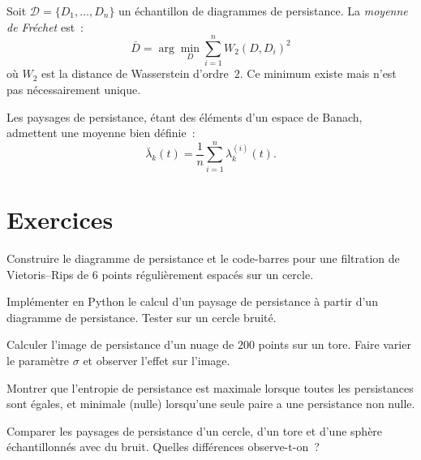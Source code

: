\begin{theoreme}
Soit $\mathcal{D} = \{D_1, \ldots, D_n\}$ un \'echantillon de
diagrammes de persistance. La \emph{moyenne de Fr\'echet} est~:
\[
  \bar{D} = \arg\min_{D} \sum_{i=1}^n W_2(D, D_i)^2
\]
o\`u $W_2$ est la distance de Wasserstein d'ordre~$2$. Ce minimum
existe mais n'est pas n\'ecessairement unique.
\end{theoreme}

\begin{proposition}
Les paysages de persistance, \'etant des \'el\'ements d'un espace de
Banach, admettent une moyenne bien d\'efinie~:
\[
  \bar{\lambda}_k(t) = \frac{1}{n} \sum_{i=1}^n \lambda_k^{(i)}(t).
\]
\end{proposition}

\section{Exercices}

\begin{exercice}
Construire le diagramme de persistance et le code-barres pour une
filtration de Vietoris--Rips de $6$ points r\'eguli\`erement espac\'es
sur un cercle.
\end{exercice}

\begin{exercice}
Impl\'ementer en Python le calcul d'un paysage de persistance \`a
partir d'un diagramme de persistance. Tester sur un cercle bruit\'e.
\end{exercice}

\begin{exercice}
Calculer l'image de persistance d'un nuage de $200$ points sur un tore.
Faire varier le param\`etre $\sigma$ et observer l'effet sur l'image.
\end{exercice}

\begin{exercice}
Montrer que l'entropie de persistance est maximale lorsque toutes les
persistances sont \'egales, et minimale (nulle) lorsqu'une seule paire
a une persistance non nulle.
\end{exercice}

\begin{exercice}
Comparer les paysages de persistance d'un cercle, d'un tore et d'une
sph\`ere \'echantillonn\'es avec du bruit. Quelles diff\'erences
observe-t-on~?
\end{exercice}
